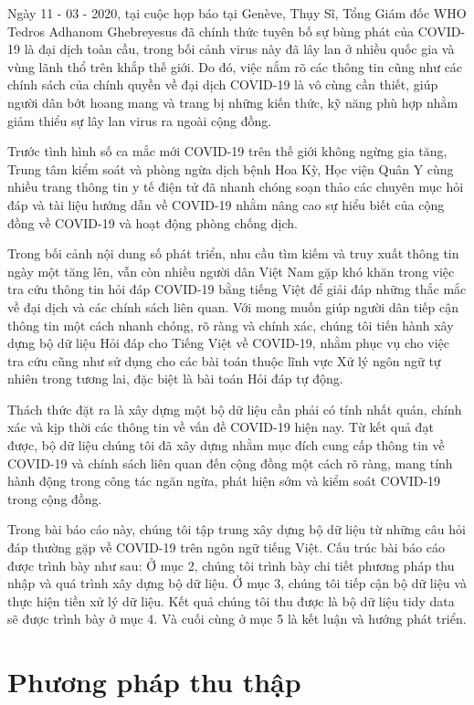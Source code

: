 \documentclass[runningheads]{llncs}
\begin{document}
Ngày 11 - 03 - 2020, tại cuộc họp báo tại Genève, Thụy Sĩ, Tổng Giám đốc WHO Tedros Adhanom Ghebreyesus đã chính thức tuyên bố sự bùng phát của COVID-19 là đại dịch toàn cầu, trong bối cảnh virus này đã lây lan ở nhiều quốc gia và vùng lãnh thổ trên khắp thế giới. Do đó, việc nắm rõ các thông tin cũng như các chính sách của chính quyền về đại dịch COVID-19 là vô cùng cần thiết, giúp người dân bớt hoang mang và trang bị những kiến thức, kỹ năng phù hợp nhằm giảm thiểu sự lây lan virus ra ngoài cộng đồng.

Trước tình hình số ca mắc mới COVID-19 trên thế giới không ngừng gia tăng, Trung tâm kiểm soát và phòng ngừa dịch bệnh Hoa Kỳ, Học viện Quân Y cùng nhiều trang thông tin y tế điện tử đã nhanh chóng soạn thảo các chuyên mục hỏi đáp và tài liệu hướng dẫn về COVID-19 nhằm nâng cao sự hiểu biết của cộng đồng về COVID-19 và hoạt động phòng chống dịch. 

Trong bối cảnh nội dung số phát triển, nhu cầu tìm kiếm và truy xuất thông tin ngày một tăng lên, vẫn còn nhiều người dân Việt Nam gặp khó khăn trong việc tra cứu thông tin hỏi đáp COVID-19 bằng tiếng Việt để giải đáp những thắc mắc về đại dịch và các chính sách liên quan.
Với mong muốn giúp người dân tiếp cận thông tin một cách nhanh chóng, rõ ràng và chính xác, chúng tôi tiến hành xây dựng bộ dữ liệu Hỏi đáp cho Tiếng Việt về COVID-19, nhằm phục vụ cho việc tra cứu cũng như sử dụng cho các bài toán thuộc lĩnh vực Xử lý ngôn ngữ tự nhiên trong tương lai, đặc biệt là bài toán Hỏi đáp tự động.

Thách thức đặt ra là xây dựng một bộ dữ liệu cần phải có tính nhất quán, chính xác và kịp thời các thông tin về vấn đề COVID-19 hiện nay. Từ kết quả đạt được, bộ dữ liệu chúng tôi đã xây dựng nhằm mục đích cung cấp thông tin về COVID-19 và chính sách liên quan đến cộng đồng một cách rõ ràng, mang tính hành động trong công tác ngăn ngừa, phát hiện sớm và kiểm soát COVID-19 trong cộng đồng.

Trong bài báo cáo này, chúng tôi tập trung xây dựng bộ dữ liệu từ những câu hỏi đáp thường gặp về COVID-19 trên ngôn ngữ tiếng Việt. Cấu trúc bài báo cáo được trình bày như sau: Ở mục 2, chúng tôi trình bày chi tiết phương pháp thu nhập và quá trình xây dựng bộ dữ liệu. Ở mục 3, chúng tôi tiếp cận bộ dữ liệu và thực hiện tiền xử lý dữ liệu. Kết quả chúng tôi thu được là bộ dữ liệu tidy data sẽ được trình bày ở mục 4. Và cuối cùng ở mục 5 là kết luận và hướng phát triển.

\section{Phương pháp thu thập}
\end{document}
